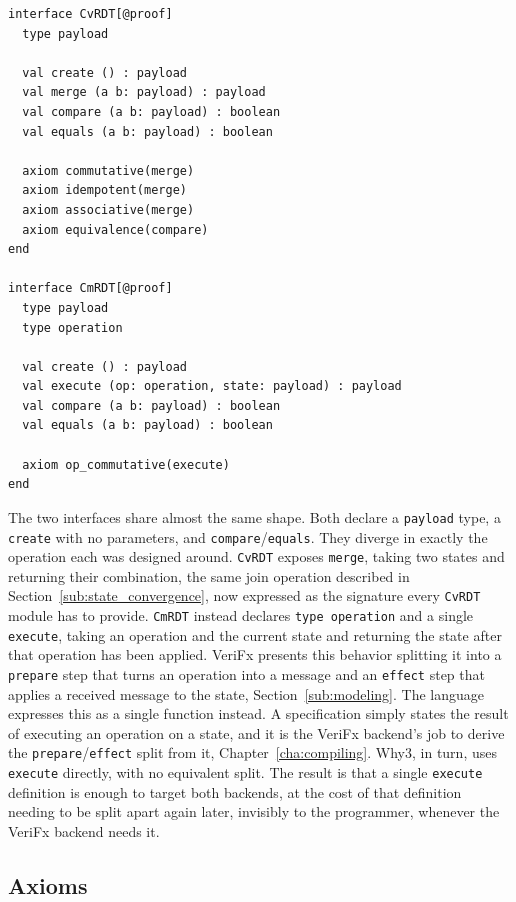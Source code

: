\begin{lstlisting}[caption={The \texttt{CvRDT} and \texttt{CmRDT} interfaces}, label={lst:interfaces}]
interface CvRDT[@proof]
  type payload

  val create () : payload
  val merge (a b: payload) : payload
  val compare (a b: payload) : boolean
  val equals (a b: payload) : boolean

  axiom commutative(merge)
  axiom idempotent(merge)
  axiom associative(merge)
  axiom equivalence(compare)
end

interface CmRDT[@proof]
  type payload
  type operation

  val create () : payload
  val execute (op: operation, state: payload) : payload
  val compare (a b: payload) : boolean
  val equals (a b: payload) : boolean

  axiom op_commutative(execute)
end
\end{lstlisting}

The two interfaces share almost the same shape. Both declare a \texttt{payload} type, a \texttt{create} with no parameters,
and \texttt{compare}/\texttt{equals}. They diverge in exactly the operation each was designed around. \texttt{CvRDT}
exposes \texttt{merge}, taking two states and returning their combination, the same join operation described in
Section~\ref{sub:state_convergence}, now expressed as the signature every \texttt{CvRDT} module has to provide.
\texttt{CmRDT} instead declares \texttt{type operation} and a single \texttt{execute}, taking an operation and the current
state and returning the state after that operation has been applied. VeriFx presents this behavior splitting it into a
\texttt{prepare} step that turns an operation into a message and an \texttt{effect} step that applies a received message
to the state, Section~\ref{sub:modeling}. The language expresses this as a single function instead. A specification simply
states the result of executing an operation on a state, and it is the VeriFx backend's job to derive the
\texttt{prepare}/\texttt{effect} split from it, Chapter~\ref{cha:compiling}. Why3, in turn, uses \texttt{execute} directly, with no
equivalent split. The result is that a single \texttt{execute} definition is enough to target both backends, at the cost
of that definition needing to be split apart again later, invisibly to the programmer, whenever the VeriFx backend needs
it.

\subsection{Axioms}
\label{sub:axioms}

